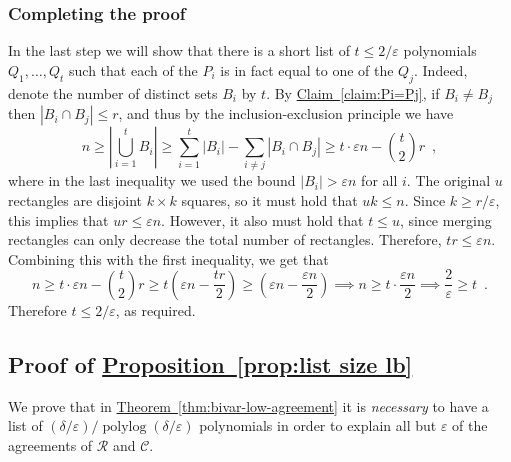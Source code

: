 \documentclass[11pt]{article}
\numberwithin{equation}{section}
\theoremstyle{definition}
\theoremstyle{plain}
\newcommand{\expref}[2]{\hyperref[#2]{#1~\ref{#2}}}
\theoremstyle{plain}
\newcommand{\colored}{}
\newcommand{\blocklength}{\colored{n}} %
\newcommand{\degree}{\colored{r}}
\newcommand{\rowpoly}{\colored{\mathcal R}}
\newcommand{\colpoly}{\colored{\mathcal C}}
\newcommand{\prox}{\colored{\delta}}
\newcommand{\numrect}{\colored{u}}
\newcommand{\polylog}{\operatorname{polylog}}
\newcommand{\eps}{\varepsilon}
\newcommand\abs[1]{\colored{\left|#1\right|}}
\begin{document}
    \subsubsection{Completing the proof}

    In the last step we will show that there is a short list of $t \leq {2}/{\eps}$
    polynomials $Q_1,\dots, Q_t$ such that each of the
%
$P_i$ is in fact equal to one of the $Q_j$.   %
%
 Indeed, denote the number of distinct sets $B_i$ by $t$. %
    By \expref{Claim}{claim:Pi=Pj}, if $B_i \neq B_j$ then $|B_i \cap B_j| \leq \degree$,
    and thus by the inclusion-exclusion principle we have
    \begin{equation*}
      \blocklength \geq \abs{ \bigcup_{i=1}^t B_i } \geq \sum_{i=1}^t \abs{B_i} - \sum_{i \neq j} \abs{B_i \cap B_j}
      \geq t \cdot \eps \blocklength - \binom{t}{2} \degree \enspace,
    \end{equation*}
    where in the last inequality we used the bound $\abs{B_i} > \eps \blocklength$ for all $i$. The original $\numrect$ rectangles are disjoint $k \times k$ squares, so it must hold that $\numrect k \leq n$. Since $k \geq {\degree}/{\eps}$, this implies that $\numrect \degree \leq \eps n$. However, it also must hold that $t \leq \numrect$, since merging rectangles can only decrease the total number of rectangles. Therefore, $t \degree \leq \eps \blocklength$. Combining this with the first inequality, we get that
    \begin{equation*}
    \blocklength \geq t \cdot \eps \blocklength - {t \choose 2} \degree \geq t \left(\eps \blocklength - \frac{t \degree}{2} \right) \geq \left(\eps \blocklength - \frac{\eps \blocklength}{2}\right) \implies \blocklength \geq t \cdot \frac{\eps \blocklength}{2} \implies \frac{2}{\eps} \geq t \enspace.
    \end{equation*}
    Therefore $t \leq {2}/{\eps}$, as required.


%
%
\subsection{Proof of \expref{Proposition}{prop:list size lb}}
\label{sec:prop-proof}

We prove that in \expref{Theorem}{thm:bivar-low-agreement} it is \emph{necessary} to have a list of ${(\prox/\eps)}/{\polylog(\prox/\eps)}$ polynomials in order to explain all but $\eps$ of the agreements of $\rowpoly$ and $\colpoly$.

\medskip
\end{document}
